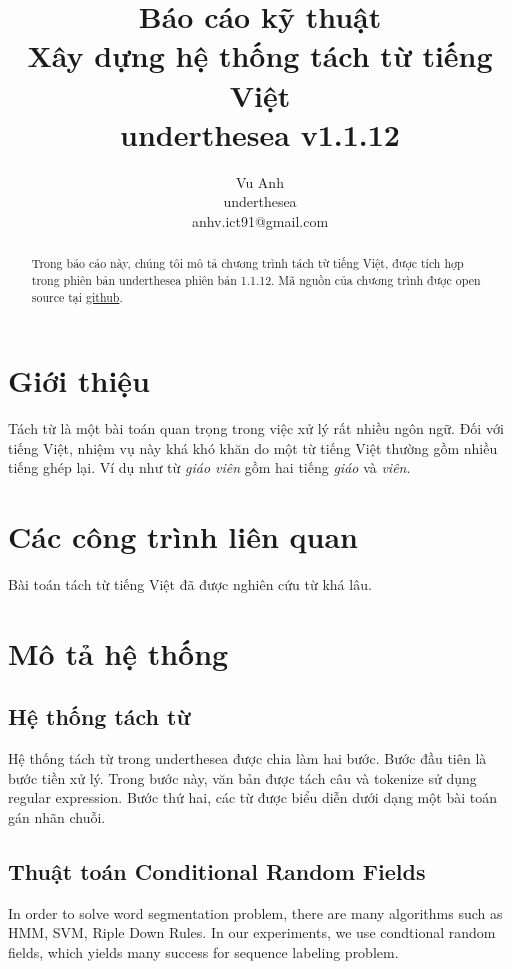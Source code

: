 \documentclass[11pt,a4paper]{article}
\title{Báo cáo kỹ thuật\\ Xây dựng hệ thống tách từ tiếng Việt \\ underthesea v1.1.12}
\author{
Vu Anh\\
underthesea\\
anhv.ict91@gmail.com
}
\date{}
\begin{document}
\maketitle
\begin{abstract}
Trong báo cáo này, chúng tôi mô tả chương trình tách từ tiếng Việt, được tích hợp trong phiên bản underthesea phiên bản 1.1.12.
Mã nguồn của chương trình được open source tại \href{https://github.com/undertheseanlp/word_tokenize}{github}.

\end{abstract}

\section{Giới thiệu}

Tách từ là một bài toán quan trọng trong việc xử lý rất nhiều ngôn ngữ. Đối với tiếng Việt, nhiệm vụ này khá khó khăn do một từ tiếng Việt thường gồm nhiều tiếng ghép lại. Ví dụ như từ \textit{giáo viên} gồm hai tiếng \textit{giáo} và \textit{viên}.

\section{Các công trình liên quan}

Bài toán tách từ tiếng Việt đã được nghiên cứu từ khá lâu.

\section{Mô tả hệ thống}

\subsection{Hệ thống tách từ}

Hệ thống tách từ trong underthesea được chia làm hai bước. Bước đầu tiên là bước tiền xử lý. Trong bước này, văn bản được tách câu và tokenize sử dụng regular expression. Bước thứ hai, các từ được biểu diễn dưới dạng một bài toán gán nhãn chuỗi.

\subsection{Thuật toán Conditional Random Fields}

In order to solve word segmentation problem, there are many algorithms such as HMM, SVM, Riple Down Rules. In our experiments, we use condtional random fields, which yields many success for sequence labeling problem.
\end{document}
